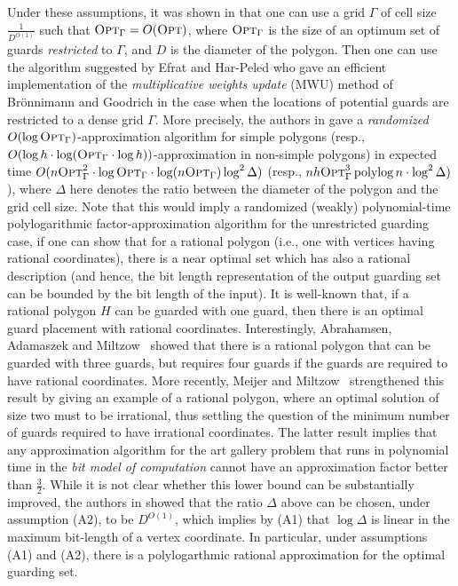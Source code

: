 \documentclass[a4paper,11pt]{article}
\newcommand{\polylog}{\operatorname{polylog}}
\def \OPT {\textsc{Opt}}
\begin{document}
Under these assumptions, it was shown in \cite{BM16} that one can use a grid $\Gamma$ of cell size $\frac{1}{D^{O(1)}}$ such that $\OPT_\Gamma=O(\OPT)$, where $\OPT_{\Gamma}$ is the size of an optimum set of guards {\it restricted} to $\Gamma$, and $D$ is the diameter of the polygon. Then one can use the algorithm suggested by Efrat and Har-Peled \cite{EH06} who gave an efficient implementation of the {\it multiplicative weights update} (MWU) method of Br\"{o}nnimann and Goodrich \cite{BG95} in the case when the locations of potential guards are restricted to a dense grid $\Gamma$. More precisely, the authors in \cite{EH06} gave a {\it randomized} $O(\log\OPT_{\Gamma})$-approximation algorithm for simple polygons (resp., $O(\log h\cdot\log(\OPT_{\Gamma}\cdot\log h))$-approximation in non-simple polygons) in expected time $O(n\OPT_{\Gamma}^2\cdot\log\OPT_{\Gamma}\cdot\log(n\OPT_{\Gamma})\log^2 \Delta)$ (resp.,  $nh\OPT_{\Gamma}^3\polylog n\cdot\log^2 \Delta)$), where $\Delta$ here denotes the ratio between the diameter of the polygon and the grid cell size. Note that this would imply a randomized (weakly) polynomial-time polylogarithmic factor-approximation algorithm for the unrestricted guarding case, if one can show that for a rational polygon (i.e., one with vertices having rational coordinates), there is a near optimal set which has also a rational description (and hence, the bit length representation of the output guarding set can be bounded by the bit length of the input). It is well-known that, if a rational polygon $H$ can be guarded with one guard, then there is an optimal guard placement with rational coordinates. Interestingly, Abrahamsen, Adamaszek and Miltzow~\cite{AAM17} showed that there is a rational polygon that can be guarded with three guards, but requires four guards if the guards are required to have rational coordinates. More recently, Meijer and Miltzow~\cite{MM22} strengthened this result by giving an example of a rational polygon, where an optimal solution of size two must to be irrational, thus settling the question of the minimum number of guards required to have irrational coordinates. The latter result implies that any approximation algorithm for the art gallery problem that runs in polynomial time in the {\it bit model of computation} cannot have an approximation factor better than $\frac32.$  While it is not clear whether this lower bound can be substantially improved, the authors in \cite{BM16} showed that the ratio $\Delta$ above can be chosen, under assumption (A2), to be $D^{O(1)}$, which implies by (A1) that $\log \Delta$ is linear in the maximum bit-length of a vertex coordinate. In particular, under assumptions (A1) and (A2), there is a polylogarthmic rational approximation for the optimal guarding set. 
\end{document}

